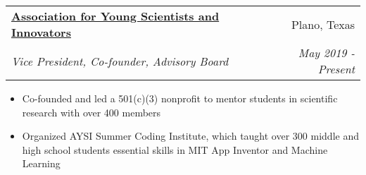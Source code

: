 \documentclass[letterpaper,11pt]{article}
\makeatletter
\newcommand{\resitem}[1]{\item[--] #1 \vspace{-8pt}}
\newcommand{\ressubheading}[4]{
	\vspace{6pt}
	\begin{tabular*}{7.5in}{l@{\extracolsep{\fill}}r}
			\textbf{#1} & #2 \\
			\textit{#3} & \textit{#4}
	\end{tabular*}
	\vspace{-12pt}
}
\makeatother
\begin{document}
	\ressubheading{\href{https://www.aysi.org}{Association for Young Scientists and Innovators}}{Plano, Texas}{Vice President, Co-founder, Advisory Board}{May 2019 - Present}
		\begin{itemize}[leftmargin=*]
			\resitem{Co-founded and led a 501(c)(3) nonprofit to mentor students in scientific research with over 400 members}
			\resitem{Organized AYSI Summer Coding Institute, which taught over 300 middle and high school students essential skills in MIT App Inventor and Machine Learning}
		\end{itemize}



\end{document}
